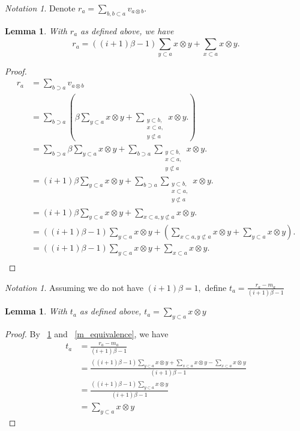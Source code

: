 \documentclass{amsart}
\newtheorem{lem}[thm]{Lemma}
\theoremstyle{remark}
\newtheorem{note}[thm]{Notation}
\begin{document}
\begin{note}
Denote $r_a = \sum_{b,b\subset a}^{} v_{a \otimes b}.$
\end{note}

\begin{lem}
\label{r_equivalence}
With $r_a$ as defined above, we have 
$$r_a = ((i+1)\beta-1)\sum_{y\subset a}^{}x\otimes y +\sum_{x\subset a}^{}x\otimes y.$$
\end{lem}
\begin{proof}
\begin{align*}
	r_a &= \sum_{b\supset a}^{}v_{a\otimes b}\\
	&=\sum_{b\supset a}^{} \left(\beta \sum_{y \subset a}^{}x \otimes y + \sum_{\substack{{y\subset b,}\\{x \subset a,}\\{y\not\subset a}}}^{}x\otimes y.\right)\\
	&= \sum_{b\supset a}^{} \beta \sum_{y \subset a}^{}x \otimes y + \sum_{b\supset a}^{} \sum_{\substack{{y\subset b,}\\{x \subset a,}\\{y\not\subset a}}}^{}x\otimes y.\\
	&= (i+1)\beta \sum_{y \subset a}^{}x \otimes y + \sum_{b\supset a}^{} \sum_{\substack{{y\subset b,}\\{x \subset a,}\\{y\not\subset a}}}^{}x\otimes y.\\
	&= (i+1)\beta \sum_{y \subset a}^{}x \otimes y + \sum_{x \subset a,y\not\subset a}^{}x\otimes y.\\
	&= ((i+1)\beta-1) \sum_{y \subset a}^{}x \otimes y + \left( \sum_{x \subset a,y\not\subset a}^{}x\otimes y+\sum_{y \subset a}^{}x \otimes y\right).\\
	&= ((i+1)\beta-1) \sum_{y \subset a}^{}x \otimes y + \sum_{x \subset a}^{}x\otimes y.\\
\end{align*}
\end{proof}
\begin{note}
Assuming we do not have $(i+1)\beta = 1,$ define $t_a = \frac{r_a - m_a}{(i+1)\beta - 1}$
\end{note}

\begin{lem}
\label{t_equivalence}
With $t_a$ as defined above, $t_a= \sum_{y\subset a}^{}x\otimes y $
\end{lem}
\begin{proof}
By ~\ref{r_equivalence} and ~\ref{m_equivalence}, we have
\begin{align*}
	t_a &= \frac{r_a - m_a}{(i+1)\beta - 1}\\
	&= \frac{((i+1)\beta-1)\sum_{y\subset a}^{}x\otimes y +\sum_{x\subset a}^{}x\otimes y-\sum_{x\subset a}^{}x\otimes y }{(i+1)\beta - 1}\\
	&= \frac{((i+1)\beta-1)\sum_{y\subset a}^{}x\otimes y}{(i+1)\beta - 1}\\
	&= \sum_{y\subset a}^{}x\otimes y
\end{align*}
\end{proof}
\end{document}
